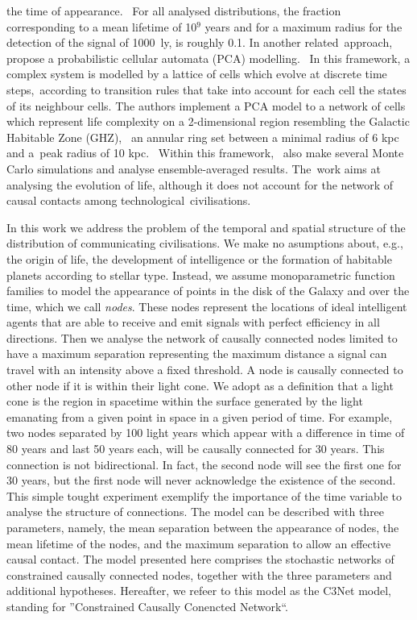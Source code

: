 \documentclass[crop]{CSLB}
\begin{document}
the time of appearance. 
%
For all analysed distributions, the fraction corresponding to a mean
lifetime of 10$^9$ years and for a maximum radius for the detection of
the signal of 1000~ly, is roughly 0.1.
%
In another related approach, \citet{vukotic_astrobiological_2012}
propose a probabilistic cellular automata (PCA) modelling. 
%
In this framework, a complex system is modelled by a lattice of cells
which evolve at discrete time steps, according to transition rules
that take into account for each cell the states of its neighbour
cells.
%
The authors implement a PCA model to a network of cells which
represent life complexity on a 2-dimensional region resembling the
Galactic Habitable Zone (GHZ),  an annular ring set between a minimal
radius of 6 kpc and a peak radius of 10 kpc. 
%
Within this framework, \citet{vukotic_astrobiological_2012} also make
several Monte Carlo simulations and analyse ensemble-averaged results.
%
The work aims at analysing the evolution of life, although it does not
account for the network of causal contacts among
technological civilisations.


In this work we address the problem of the temporal and spatial
structure of the distribution of communicating civilisations.
%
We make no asumptions about, e.g., the origin of life, the development
of intelligence or the formation of habitable planets according to
stellar type.
%
Instead, we assume monoparametric function families to model the
appearance of points in the disk of the Galaxy and over the time,
which we call \textit{nodes}.
%
These nodes represent the locations of ideal intelligent agents that
are able to receive and emit signals with perfect efficiency in all
directions.
%
Then we analyse the network of causally connected nodes limited to
have a maximum separation representing the maximum distance a signal
can travel with an intensity above a fixed threshold.
%
A node is causally connected to other node if it is within their light
cone.
%
We adopt as a definition that a light cone is the region in spacetime
within the surface generated by the light emanating from a given point
in space in a given period of time.
%
For example, two nodes separated by 100 light years which appear with
a difference in time of 80 years and last 50 years each, will be
causally connected for 30 years.
%
This connection is not bidirectional.
%
In fact, the second node will see the first one for 30 years, but the
first node will never acknowledge the existence of the second.
%
This simple tought experiment exemplify the importance of the time
variable to analyse the structure of connections.
%
The model can be described with three parameters, namely, the mean separation
between the appearance of nodes, the mean lifetime of the nodes, and
the maximum separation to allow an effective causal contact.
%
The model presented here comprises 
the stochastic networks of constrained causally connected nodes,
together with the three parameters and additional hypotheses.
%
Hereafter, we refeer to this model as the C3Net model, standing for
''Constrained Causally Conencted Network``.
\end{document}
